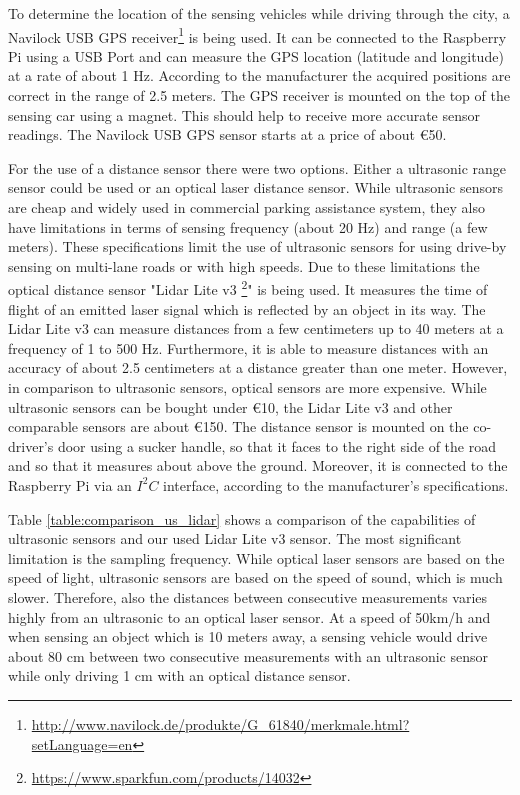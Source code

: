 To determine the location of the sensing vehicles while driving through the city, a Navilock USB GPS receiver\footnote{\url{http://www.navilock.de/produkte/G_61840/merkmale.html?setLanguage=en}} is being used. It can be connected to the Raspberry Pi using a USB Port and can measure the GPS location (latitude and longitude) at a rate of about 1 Hz. According to the manufacturer the acquired positions are correct in the range of 2.5 meters. The GPS receiver is mounted on the top of the sensing car using a magnet. This should help to receive more accurate sensor readings. The Navilock USB GPS sensor starts at a price of about \euro{50}.

For the use of a distance sensor there were two options. Either a ultrasonic range sensor could be used or an optical laser distance sensor. While ultrasonic sensors are cheap and widely used in commercial parking assistance system, they also have limitations in terms of sensing frequency (about 20 Hz) and range (a few meters). These specifications limit the use of ultrasonic sensors for using drive-by sensing on multi-lane roads or with high speeds.   Due to these limitations the optical distance sensor "Lidar Lite v3 \footnote{\url{https://www.sparkfun.com/products/14032}}" is being used. It measures the time of flight of an emitted laser signal which is reflected by an object in its way. The Lidar Lite v3 can measure distances from a few centimeters up to 40 meters at a frequency of 1 to 500 Hz. Furthermore, it is able to measure distances with an accuracy of about 2.5 centimeters at a distance greater than one meter. However, in comparison to ultrasonic sensors, optical sensors are more expensive. While ultrasonic sensors can be bought under \euro{10}, the Lidar Lite v3 and other comparable sensors are about \euro{150}. The distance sensor is mounted on the co-driver's door using a sucker handle, so that it faces to the right side of the road and so that it measures about \todo{40cm} above the ground. Moreover, it is connected to the Raspberry Pi via an $I^2C$ interface, according to the manufacturer's specifications.

Table \ref{table:comparison_us_lidar} shows a comparison of the capabilities of ultrasonic sensors and our used Lidar Lite v3 sensor. The most significant limitation is the sampling frequency. While optical laser sensors are based on the speed of light, ultrasonic sensors are based on the speed of sound, which is much slower. Therefore, also the distances between consecutive measurements varies highly from an ultrasonic to an optical laser sensor. At a speed of 50km/h and when sensing an object which is 10 meters away, a sensing vehicle would drive about 80 cm between two consecutive measurements with an ultrasonic sensor while only driving 1 cm with an optical distance sensor.



